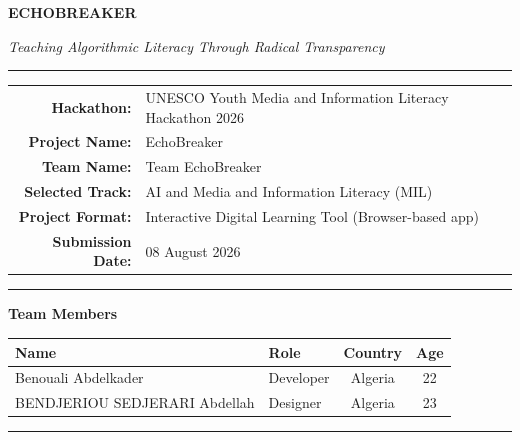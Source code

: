 \documentclass[11pt, a4paper]{article}
\begin{document}
\thispagestyle{empty}
\begin{center}

  \vspace*{0.6cm}
  
  \vspace{0.35cm}

  {\fontsize{36}{40}\selectfont
    \textbf{\textcolor{echoink}{ECHO}\textcolor{echored}{BREAKER}}}

  \vspace{0.3cm}
  {\large\itshape\textcolor{echomuted}{Teaching Algorithmic Literacy Through Radical Transparency}}

  \vspace{0.8cm}
  \textcolor{echoborder}{\rule{0.65\textwidth}{0.8pt}}
  \vspace{0.4cm}

  {\normalsize
    \begin{tabular}{rl}
      \textbf{Hackathon:}  & UNESCO Youth Media and Information Literacy Hackathon 2026\\[4pt]
      \textbf{Project Name:} & EchoBreaker \\[4pt]
      \textbf{Team Name:}  & Team EchoBreaker \\[4pt]
      \textbf{Selected Track:} & AI and Media and Information Literacy (MIL) \\[4pt]
      \textbf{Project Format:} & Interactive Digital Learning Tool (Browser-based app)\\[4pt]
      \textbf{Submission Date:} & 08 August 2026 \\
    \end{tabular}
  }

  \vspace{0.8cm}
  \textcolor{echoborder}{\rule{0.65\textwidth}{0.8pt}}
  \vspace{0.4cm}

  {\normalsize
    \textbf{Team Members}\\[8pt]
    \renewcommand{\arraystretch}{1.3}
    \begin{tabular}{llcc}
      \textbf{Name} & \textbf{Role} & \textbf{Country} & \textbf{Age} \\
      \midrule
      Benouali Abdelkader & Developer & Algeria & 22 \\
      BENDJERIOU SEDJERARI Abdellah & Designer & Algeria & 23 \\
    \end{tabular}
  }

  \vspace{0.8cm}
  \textcolor{echoborder}{\rule{0.65\textwidth}{0.8pt}}

\end{center}
\end{document}
